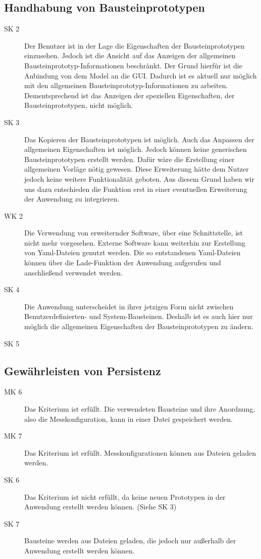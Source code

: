 \documentclass[parskip=full]{scrartcl}
\begin{document}
\subsection{Handhabung von Bausteinprototypen}

\begin{description}
	\item[SK 2] Der Benutzer ist in der Lage die Eigenschaften der Bausteinprototypen einzusehen. Jedoch ist die Ansicht auf das Anzeigen der \gls{allgemeinen Bausteinprototyp-Informationen} beschränkt. Der Grund hierfür ist die Anbindung von dem Model an die GUI. Dadurch ist es aktuell nur möglich mit den allgemeinen Bausteinprototyp-Informationen zu arbeiten. Dementsprechend ist das Anzeigen der speziellen Eigenschaften, der Bausteinprototypen, nicht möglich.
	\item[SK 3] Das Kopieren der Bausteinprototypen ist möglich. Auch das Anpassen der allgemeinen Eigenschaften ist möglich. Jedoch können keine generischen Bausteinprototypen erstellt werden. Dafür wäre die Erstellung einer allgemeinen Vorläge nötig gewesen. Diese Erweiterung hätte dem Nutzer jedoch keine weitere Funktionalität geboten. Aus diesem Grund haben wir uns dazu entschieden die Funktion erst in einer eventuellen Erweiterung der Anwendung zu integrieren.
	\item[WK 2] Die Verwendung von erweiternder Software, über eine Schnittstelle, ist nicht mehr vorgesehen. Externe Software kann weiterhin zur Erstellung von Yaml-Dateien genutzt werden. Die so entstandenen Yaml-Dateien können über die Lade-Funktion der Anwendung aufgerufen und anschließend verwendet werden.
	\item[SK 4] Die Anwendung unterscheidet in ihrer jetzigen Form nicht zwischen Benutzerdefinierten- und System-Bausteinen. Deshalb ist es auch hier nur möglich die allgemeinen Eigenschaften der Bausteinprototypen zu ändern.
	\item[SK 5]
\end{description}
		
\subsection{Gewährleisten von Persistenz}

\begin{description}
\item[MK 6] Das Kriterium ist erfüllt. Die verwendeten Bausteine und ihre Anordnung, also die Messkonfiguration, kann in einer Datei gespeichert werden.
\item[MK 7] Das Kriterium ist erfüllt. Messkonfigurationen können aus Dateien geladen werden.
\item[SK 6] Das Kriterium ist nicht erfüllt, da keine neuen Prototypen in der Anwendung erstellt werden können. (Siehe SK 3)
\item[SK 7] Bausteine werden aus Dateien geladen, die jedoch nur außerhalb der Anwendung erstellt werden können.
\end{description}
\end{document}

